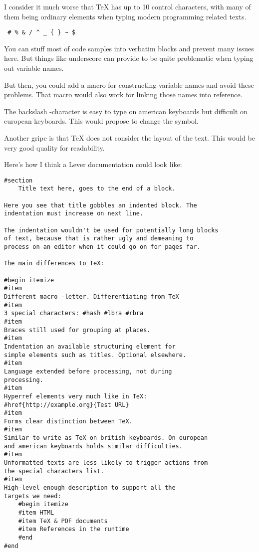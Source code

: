 \documentclass{article}
\begin{document}
I consider it much worse that TeX has up to 10 control
characters, with many of them being ordinary elements when
typing modern programming related texts.

\verb= # % & / ^ _ { } ~ $ =

You can stuff most of code samples into verbatim blocks and
prevent many issues here. But things like underscore can
provide to be quite problematic when typing out variable
names.

But then, you could add a macro for constructing variable
names and avoid these problems. That macro would also work
for linking those names into reference.

The backslash -character is easy to type on american
keyboards but difficult on european keyboards. This would
propose to change the symbol.

Another gripe is that TeX does not consider the layout of
the text. This would be very good quality for readability.

Here's how I think a Lever documentation could look like:

\begin{verbatim}
#section
    Title text here, goes to the end of a block.

Here you see that title gobbles an indented block. The
indentation must increase on next line.

The indentation wouldn't be used for potentially long blocks
of text, because that is rather ugly and demeaning to
process on an editor when it could go on for pages far.

The main differences to TeX:

#begin itemize
#item
Different macro -letter. Differentiating from TeX
#item
3 special characters: #hash #lbra #rbra
#item
Braces still used for grouping at places.
#item
Indentation an available structuring element for
simple elements such as titles. Optional elsewhere.
#item
Language extended before processing, not during
processing.
#item 
Hyperref elements very much like in TeX:
#href{http://example.org}{Test URL}
#item
Forms clear distinction between TeX.
#item
Similar to write as TeX on british keyboards. On european
and american keyboards holds similar difficulties.
#item
Unformatted texts are less likely to trigger actions from
the special characters list.
#item
High-level enough description to support all the
targets we need:
    #begin itemize
    #item HTML
    #item TeX & PDF documents
    #item References in the runtime
    #end
#end
\end{verbatim}
\end{document}
